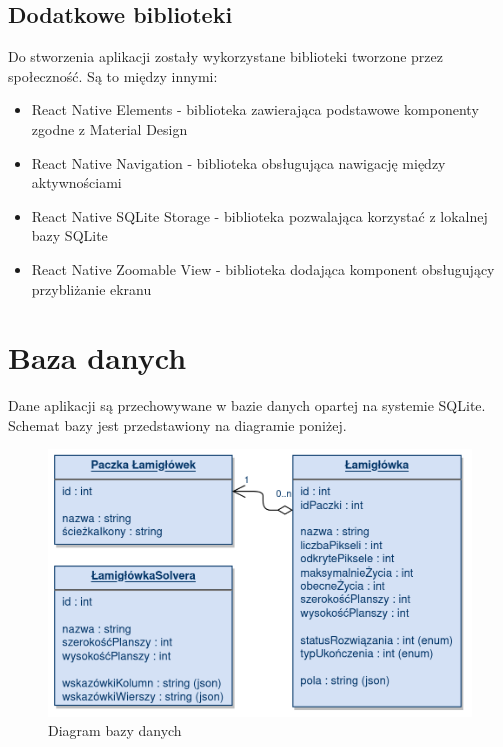 \subsection{Dodatkowe biblioteki}
	Do stworzenia aplikacji zostały wykorzystane biblioteki tworzone przez społeczność. Są to
między innymi:
\begin{itemize}
	\item React Native Elements \cite{RN-Elements} - biblioteka zawierająca podstawowe komponenty 
zgodne z Material Design
	\item React Native Navigation \cite{RN-Navigation} - biblioteka obsługująca nawigację między 
aktywnościami
	\item React Native SQLite Storage \cite{RN-SQLite} - biblioteka pozwalająca korzystać z lokalnej
bazy SQLite
	\item React Native Zoomable View \cite{RN-Zooming} - biblioteka dodająca komponent obsługujący 
przybliżanie ekranu
\end{itemize}


\section{Baza danych}
	Dane aplikacji są przechowywane w bazie danych opartej na systemie SQLite. Schemat bazy jest
przedstawiony na diagramie poniżej.

\begin{figure}[!htb]
    \centering
    \includegraphics[width=\textwidth]{images/db_diagram.png}
    \caption{Diagram bazy danych}
\end{figure}


